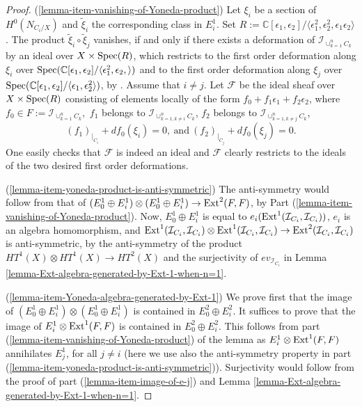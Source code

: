 \documentclass[12pt]{amsart}
\numberwithin{equation}{subsection}
\theoremstyle{plain}
\theoremstyle{definition}
\newcommand{\CC}{{\mathbb C}}
\newcommand{\F}{{\mathcal F}}
\newcommand{\restricted}[2]{#1_{\mid_{#2}}}
\newcommand{\Ext}{{\rm Ext}}
\newcommand{\Ideal}[1]{{\mathcal I}_{#1}}
\newcommand{\Spec}{{\rm Spec}}
\begin{document}
\begin{proof}
(\ref{lemma-item-vanishing-of-Yoneda-product})
Let $\xi_i$ be a section of $H^0(N_{C_i/X})$ and $\tilde{\xi}_i$ the corresponding class in $E^1_i$. 
Set $R:=\CC[\epsilon_1,\epsilon_2]/\langle \epsilon_1^2,\epsilon_2^2,\epsilon_1\epsilon_2\rangle$. 
The product $\tilde{\xi}_i\circ\tilde{\xi}_j$ vanishes, if and only if there exists a deformation of  $\Ideal{\cup_{k=1}^nC_k}$ 
by an ideal over $X\times \Spec(R)$, which restricts to 
the first order deformation along $\xi_i$ over $\Spec(\CC[\epsilon_1,\epsilon_2]/\langle \epsilon_1^2,\epsilon_2,\rangle)$ and to the first order deformation along $\xi_j$ over
$\Spec(\CC[\epsilon_1,\epsilon_2]/\langle \epsilon_1,\epsilon_2^2\rangle)$,
by \cite[Sec. 2]{artamkin}. 
Assume that $i\neq j$.
Let $\F$ be the ideal sheaf over $X\times \Spec(R)$ consisting of elements locally of the form
$f_0+f_1\epsilon_1+f_2\epsilon_2$, where 
$
f_0\in F:=\Ideal{\cup_{k=1}^n C_k}, 
$
$f_1$ belongs to $\Ideal{\cup_{k=1,k\neq i}^nC_k}$,
$f_2$ belongs to $\Ideal{\cup_{k=1,k\neq j}^nC_k}$,
\[
(f_1\restricted{)}{C_i}+df_0(\xi_i)=0, \  \mbox{and} \ (f_2\restricted{)}{C_j}+df_0(\xi_j)=0.
\]
One easily checks that $\F$ is indeed an ideal and $\F$ clearly restricts to the ideals of the two desired first order deformations.

(\ref{lemma-item-yoneda-product-is-anti-symmetric}) The anti-symmetry would follow from that of $(E^1_0\oplus E^1_i)\otimes (E^1_0\oplus E^1_i)\rightarrow \Ext^2(F,F)$, by
Part (\ref{lemma-item-vanishing-of-Yoneda-product}). Now, $E^1_0\oplus E^1_i$ is equal to $e_i(\Ext^1(\Ideal{C_i},\Ideal{C_i}))$, $e_i$ is an algebra homomorphism, and $\Ext^1(\Ideal{C_i},\Ideal{C_i})\otimes \Ext^1(\Ideal{C_i},\Ideal{C_i})\rightarrow \Ext^2(\Ideal{C_i},\Ideal{C_i})$ is anti-symmetric, 
by the anti-symmetry of the product $HT^1(X)\otimes HT^1(X)\rightarrow HT^2(X)$ and the surjectivity of $ev_{\Ideal{C_i}}$ in Lemma \ref{lemma-Ext-algebra-generated-by-Ext-1-when-n=1}.


(\ref{lemma-item-Yoneda-algebra-generated-by-Ext-1}) 
We prove first that the image of $(E^1_0\oplus E^1_i)\otimes (E^1_0\oplus E^1_i)$ is contained in $E^2_0\oplus E^2_i$. It suffices to prove that the image of $E^1_i\otimes \Ext^1(F,F)$ is contained in $E^2_0\oplus E^2_i$. This follows from part 
(\ref{lemma-item-vanishing-of-Yoneda-product}) of the lemma as $E^1_i\otimes \Ext^1(F,F)$ annihilates $E^1_j$, for all $j\neq i$ (here we use also the anti-symmetry property in part (\ref{lemma-item-yoneda-product-is-anti-symmetric})).
Surjectivity would follow from the proof of part (\ref{lemma-item-image-of-e-j}) and 
Lemma \ref{lemma-Ext-algebra-generated-by-Ext-1-when-n=1}.


\end{proof}
\end{document}

